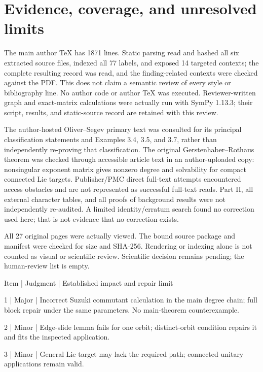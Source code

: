 \documentclass[10pt]{article}
\begin{document}
\section*{Evidence, coverage, and unresolved limits}
The main author TeX has 1871 lines. Static parsing read and hashed all six extracted source files, indexed all 77 labels, and exposed 14 targeted contexts; the complete resulting record was read, and the finding-related contexts were checked against the PDF. This does not claim a semantic review of every style or bibliography line. No author code or author TeX was executed. Reviewer-written graph and exact-matrix calculations were actually run with SymPy 1.13.3; their script, results, and static-source record are retained with this review.\par
The author-hosted Oliver–Segev primary text was consulted for its principal classification statements and Examples 3.4, 3.5, and 3.7, rather than independently re-proving that classification. The original Gerstenhaber–Rothaus theorem was checked through accessible article text in an author-uploaded copy: nonsingular exponent matrix gives nonzero degree and solvability for compact connected Lie targets. Publisher/PMC direct full-text attempts encountered access obstacles and are not represented as successful full-text reads. Part II, all external character tables, and all proofs of background results were not independently re-audited. A limited identity/erratum search found no correction used here; that is not evidence that no correction exists.\par
All 27 original pages were actually viewed. The bound source package and manifest were checked for size and SHA-256. Rendering or indexing alone is not counted as visual or scientific review. Scientific decision remains pending; the human-review list is empty.\par
Item | Judgment | Established impact and repair limit\par
1 | Major | Incorrect Suzuki commutant calculation in the main degree chain; full block repair under the same parameters. No main-theorem counterexample.\par
2 | Minor | Edge-slide lemma fails for one orbit; distinct-orbit condition repairs it and fits the inspected application.\par
3 | Minor | General Lie target may lack the required path; connected unitary applications remain valid.\par
\end{document}
